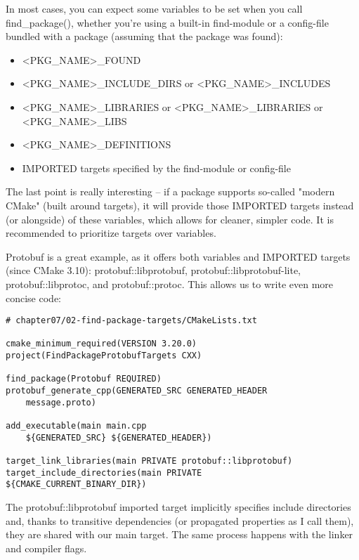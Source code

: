 In most cases, you can expect some variables to be set when you call find\_package(), whether you're using a built-in find-module or a config-file bundled with a package (assuming that the package was found):

\begin{itemize}
\item 
<PKG\_NAME>\_FOUND

\item 
<PKG\_NAME>\_INCLUDE\_DIRS or <PKG\_NAME>\_INCLUDES

\item 
<PKG\_NAME>\_LIBRARIES or <PKG\_NAME>\_LIBRARIES or <PKG\_NAME>\_LIBS

\item 
<PKG\_NAME>\_DEFINITIONS

\item 
IMPORTED targets specified by the find-module or config-file
\end{itemize}

The last point is really interesting – if a package supports so-called "modern CMake" (built around targets), it will provide those IMPORTED targets instead (or alongside) of these variables, which allows for cleaner, simpler code. It is recommended to prioritize targets over variables.

Protobuf is a great example, as it offers both variables and IMPORTED targets (since CMake 3.10): protobuf::libprotobuf, protobuf::libprotobuf-lite, protobuf::libprotoc, and protobuf::protoc. This allows us to write even more concise code:

\begin{lstlisting}[style=styleCMake]
# chapter07/02-find-package-targets/CMakeLists.txt

cmake_minimum_required(VERSION 3.20.0)
project(FindPackageProtobufTargets CXX)

find_package(Protobuf REQUIRED)
protobuf_generate_cpp(GENERATED_SRC GENERATED_HEADER
	message.proto)

add_executable(main main.cpp
	${GENERATED_SRC} ${GENERATED_HEADER})
	
target_link_libraries(main PRIVATE protobuf::libprotobuf)
target_include_directories(main PRIVATE
${CMAKE_CURRENT_BINARY_DIR})
\end{lstlisting}

The protobuf::libprotobuf imported target implicitly specifies include directories and, thanks to transitive dependencies (or propagated properties as I call them), they are shared with our main target. The same process happens with the linker and compiler flags.

